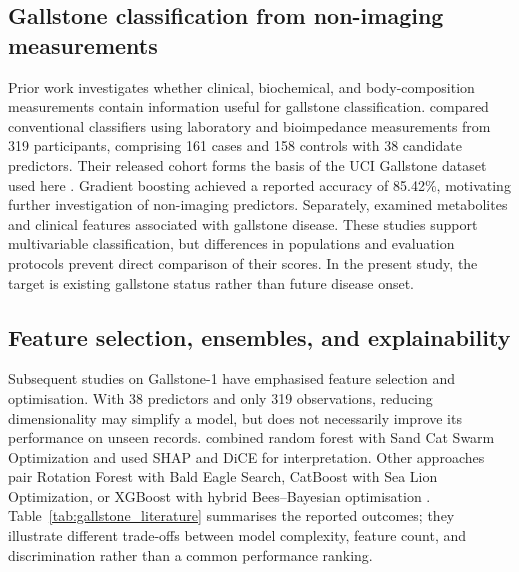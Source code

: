 \label{sec:literature_review}
\subsection{Gallstone classification from non-imaging measurements}
Prior work investigates whether clinical, biochemical, and body-composition measurements contain information useful for gallstone classification. \textcite{esen2024early} compared conventional classifiers using laboratory and bioimpedance measurements from 319 participants, comprising 161 cases and 158 controls with 38 candidate predictors. Their released cohort forms the basis of the UCI Gallstone dataset used here \parencite{uci2025gallstone}. Gradient boosting achieved a reported accuracy of 85.42\%, motivating further investigation of non-imaging predictors. Separately, \textcite{salem2023ml} examined metabolites and clinical features associated with gallstone disease. These studies support multivariable classification, but differences in populations and evaluation protocols prevent direct comparison of their scores. In the present study, the target is existing gallstone status rather than future disease onset.

\subsection{Feature selection, ensembles, and explainability}
Subsequent studies on Gallstone-1 have emphasised feature selection and optimisation. With 38 predictors and only 319 observations, reducing dimensionality may simplify a model, but does not necessarily improve its performance on unseen records. \textcite{sarker2025gallstone} combined random forest with Sand Cat Swarm Optimization and used SHAP and DiCE for interpretation. Other approaches pair Rotation Forest with Bald Eagle Search, CatBoost with Sea Lion Optimization, or XGBoost with hybrid Bees--Bayesian optimisation \parencite{shrestha2026metaheuristic,das2026sloa,rahman2026hbb}. Table~\ref{tab:gallstone_literature} summarises the reported outcomes; they illustrate different trade-offs between model complexity, feature count, and discrimination rather than a common performance ranking.

